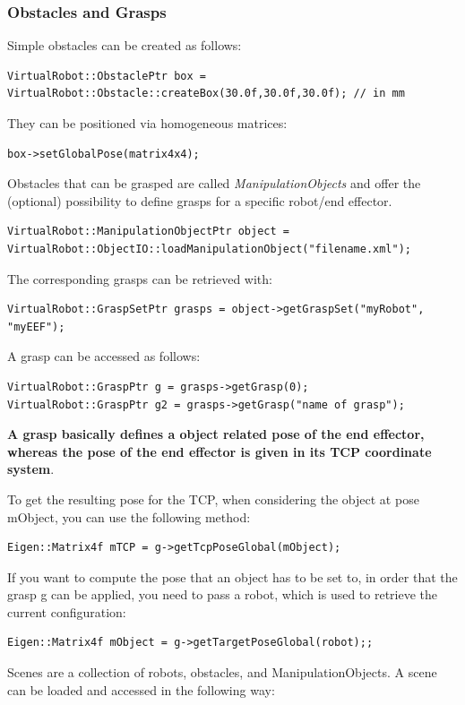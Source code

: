 \subsubsection{Obstacles and Grasps}
Simple obstacles can be created as follows: 
\begin{lstlisting}
VirtualRobot::ObstaclePtr box = VirtualRobot::Obstacle::createBox(30.0f,30.0f,30.0f); // in mm
\end{lstlisting}
They can be positioned via homogeneous matrices: 
\begin{lstlisting}
box->setGlobalPose(matrix4x4);
\end{lstlisting}
Obstacles that can be grasped are called \textit{ManipulationObjects} and offer the (optional) possibility to define grasps for a specific robot/end effector. 
\begin{lstlisting}
VirtualRobot::ManipulationObjectPtr object = VirtualRobot::ObjectIO::loadManipulationObject("filename.xml");
\end{lstlisting}
The corresponding grasps can be retrieved with: 
\begin{lstlisting}
VirtualRobot::GraspSetPtr grasps = object->getGraspSet("myRobot", "myEEF");
\end{lstlisting}
A grasp can be accessed as follows: 
\begin{lstlisting}
VirtualRobot::GraspPtr g = grasps->getGrasp(0);
VirtualRobot::GraspPtr g2 = grasps->getGrasp("name of grasp");
\end{lstlisting}
\textbf{A grasp basically defines a object related pose of the end effector, whereas the pose of the end effector is given in its TCP coordinate system}.\par To get the resulting pose for the TCP, when considering the object at pose mObject, you can use the following method: 
\begin{lstlisting}
Eigen::Matrix4f mTCP = g->getTcpPoseGlobal(mObject);
\end{lstlisting}
If you want to compute the pose that an object has to be set to, in order that the grasp g can be applied, you need to pass a robot, which is used to retrieve the current configuration: 
\begin{lstlisting}
Eigen::Matrix4f mObject = g->getTargetPoseGlobal(robot);;
\end{lstlisting}
Scenes are a collection of robots, obstacles, and ManipulationObjects. A scene can be loaded and accessed in the following way: 
